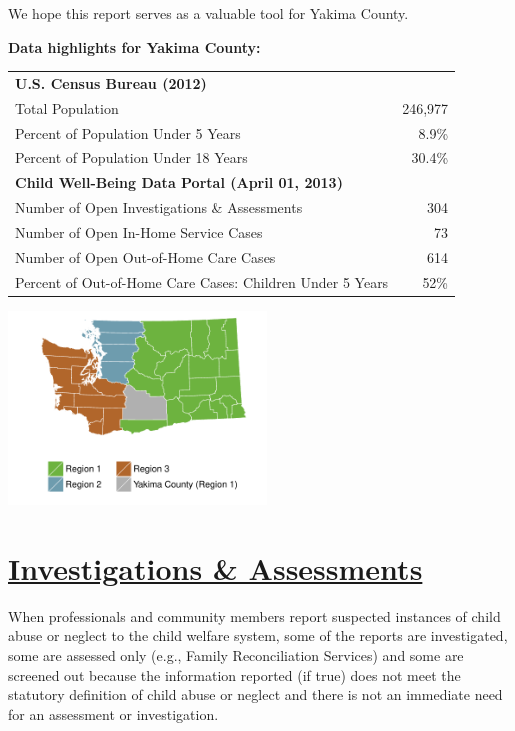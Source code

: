 \documentclass{article}\usepackage[]{graphicx}\usepackage[]{color}
\begin{document}
We hope this report serves as a valuable tool for  Yakima County.

\begin{minipage}{0.6\textwidth}
\textbf{Data highlights for Yakima County:}

\begin{tabular}{lr}
  \toprule
 \textbf{U.S. Census Bureau (2012)} &  \\ 
  \quad Total Population & 246,977 \\ 
  \quad Percent of Population Under 5 Years & 8.9\% \\ 
  \quad Percent of Population Under 18 Years & 30.4\% \\ 
  \textbf{Child Well-Being Data Portal (April 01, 2013)} &  \\ 
  \quad Number of Open Investigations \& Assessments & 304 \\ 
  \quad Number of Open In-Home Service Cases & 73 \\ 
  \quad Number of Open Out-of-Home Care Cases & 614 \\ 
  \quad Percent of Out-of-Home Care Cases: Children Under 5 Years & 52\% \\ 
   \bottomrule
\end{tabular}



\end{minipage}
\begin{minipage}{0.4\textwidth}

\begin{center}
\includegraphics[width=2.7in]{county_maps/Yakima-b}
\end{center}

\end{minipage}


\newpage
\restoregeometry
\section{\href{http://www.partnersforourchildren.org//child-well-being/visualizations/investigations-assessments/trends}
{Investigations \& Assessments}}
When professionals and community members report suspected instances of child abuse or neglect to the child welfare system, some of the reports are investigated, some are assessed only (e.g., Family Reconciliation Services) and some are screened out because the information reported (if true) does not meet the statutory definition of child abuse or neglect and there is not an immediate need for an assessment or investigation.\\[6pt]
\label{p:ia}
\end{document}
